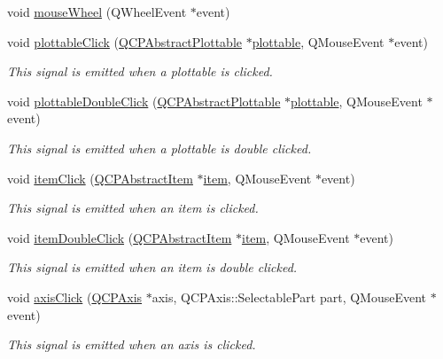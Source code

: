 \begin{DoxyCompactItemize}
void \hyperlink{a00116_ac80a14206f99304a91d2aa55775ec3ff}{mouse\+Wheel} (Q\+Wheel\+Event $\ast$event)
\item 
void \hyperlink{a00116_a57e5efa8a854620e9bf62d31fc139f53}{plottable\+Click} (\hyperlink{a00024}{Q\+C\+P\+Abstract\+Plottable} $\ast$\hyperlink{a00116_afe26a6b79add0a11ae52f5700534ddb7}{plottable}, Q\+Mouse\+Event $\ast$event)
\begin{DoxyCompactList}\small\item\em This signal is emitted when a plottable is clicked. \end{DoxyCompactList}\item 
void \hyperlink{a00116_af2e6f1cea923dae437681d01ce7d0c31}{plottable\+Double\+Click} (\hyperlink{a00024}{Q\+C\+P\+Abstract\+Plottable} $\ast$\hyperlink{a00116_afe26a6b79add0a11ae52f5700534ddb7}{plottable}, Q\+Mouse\+Event $\ast$event)
\begin{DoxyCompactList}\small\item\em This signal is emitted when a plottable is double clicked. \end{DoxyCompactList}\item 
void \hyperlink{a00116_ae16b51f52d2b7aebbc7e3e74e6ff2e4b}{item\+Click} (\hyperlink{a00022}{Q\+C\+P\+Abstract\+Item} $\ast$\hyperlink{a00116_a1138cb2d142c23006e7901494e256774}{item}, Q\+Mouse\+Event $\ast$event)
\begin{DoxyCompactList}\small\item\em This signal is emitted when an item is clicked. \end{DoxyCompactList}\item 
void \hyperlink{a00116_ac83aa9f5a3e9bb3efc9cdc763dcd42a6}{item\+Double\+Click} (\hyperlink{a00022}{Q\+C\+P\+Abstract\+Item} $\ast$\hyperlink{a00116_a1138cb2d142c23006e7901494e256774}{item}, Q\+Mouse\+Event $\ast$event)
\begin{DoxyCompactList}\small\item\em This signal is emitted when an item is double clicked. \end{DoxyCompactList}\item 
void \hyperlink{a00116_abf635f8b56ab5c16d5de9f358543e82b}{axis\+Click} (\hyperlink{a00025}{Q\+C\+P\+Axis} $\ast$axis, Q\+C\+P\+Axis\+::\+Selectable\+Part part, Q\+Mouse\+Event $\ast$event)
\begin{DoxyCompactList}\small\item\em This signal is emitted when an axis is clicked. \end{DoxyCompactList}\item 

\end{DoxyCompactItemize}
